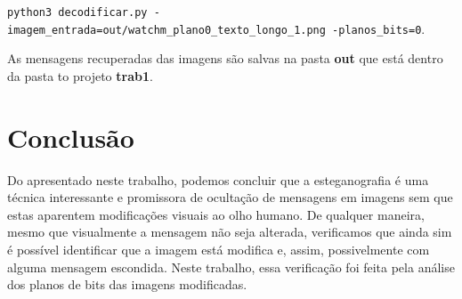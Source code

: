 \documentclass{article}
\begin{document}
\lstinline{python3 decodificar.py -imagem_entrada=out/watchm_plano0_texto_longo_1.png -planos_bits=0}.

\noindent
As mensagens recuperadas das imagens são salvas na pasta \textbf{out} que está dentro da pasta to projeto \textbf{trab1}.

\section{Conclusão}
Do apresentado neste trabalho, podemos concluir que a esteganografia é uma técnica interessante e promissora de ocultação de mensagens em imagens sem que estas aparentem modificações visuais ao olho humano. De qualquer maneira, mesmo que visualmente a mensagem não seja alterada, verificamos que ainda sim é possível identificar que a imagem está modifica e, assim, possivelmente com alguma mensagem escondida. Neste trabalho, essa verificação foi feita pela análise dos planos de bits das imagens modificadas.
\end{document}

